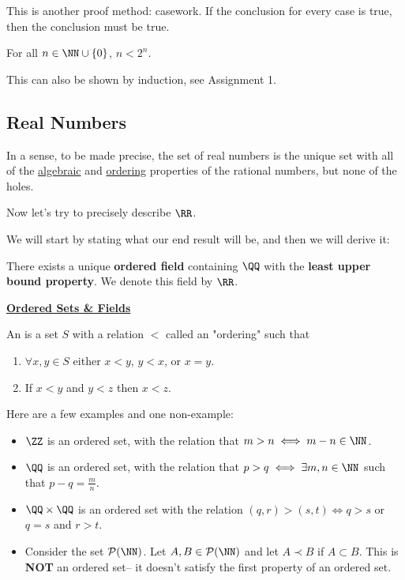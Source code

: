 \begin{remark}
This is another proof method: casework. If the conclusion for every case is true, then the conclusion must be true.
\end{remark}

\begin{corollary}
For all $n\in \NN\cup \{0\}$, $n<2^n$.
\end{corollary}
\begin{remark}
This can also be shown by induction, see Assignment 1.
\end{remark}

\subsection*{Real Numbers}

\begin{remark}
In a sense, to be made precise, the set of real numbers is the unique set with all of the \underline{algebraic} and \underline{ordering} properties of the rational numbers, but none of the holes.
\end{remark}

\begin{problem}
Now let's try to precisely describe $\RR$.
\end{problem}
We will start by stating what our end result will be, and then we will derive it:
\begin{theorem}
There exists a unique \textbf{ordered field} containing $\QQ$ with the \textbf{least upper bound property}. We denote this field by $\RR$.
\end{theorem}

\noindent\underline{\textbf{Ordered Sets \& Fields}}

\begin{definition}
An  is a set $S$ with a relation $<$ called an "ordering" such that
\begin{enumerate}
    \item $\forall x,y\in S$ either $x<y$, $y<x$, or $x=y$.
    \item If $x<y$ and $y<z$ then $x<z$.
\end{enumerate}
\end{definition}

Here are a few examples and one non-example:
\begin{itemize}
    \item $\ZZ$ is an ordered set, with the relation that $m>n\iff m-n\in \NN$.
    \item $\QQ$ is an ordered set, with the relation that $p>q\iff \exists m,n\in \NN$ such that $p-q = \frac{m}{n}$.
    \item $\QQ\times \QQ$ is an ordered set with the relation $(q,r)>(s,t)\iff q>s$ or $q=s$ and $r>t$. 
    \item Consider the set $\mathcal P(\NN)$. Let $A,B\in \mathcal P(\NN)$ and let $A\prec B$ if $A\subset B$. This is \textbf{NOT} an ordered set-- it doesn't satisfy the first property of an ordered set.
\end{itemize}

